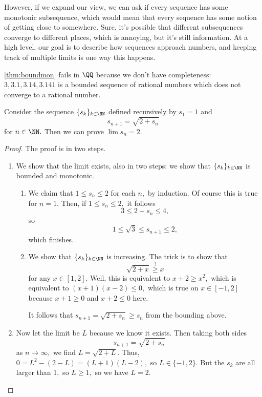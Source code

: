 However, if we expand our view, we can ask if every sequence has some monotonic subsequence, which would mean that every sequence has some notion of getting close to somewhere. Sure, it's possible that different subsequences converge to different places, which is annoying, but it's still information. At a high level, our goal is to describe how sequences approach numbers, and keeping track of multiple limits is one way this happens.
\begin{remark}
    \autoref{thm:boundmon} fails in $\QQ$ because we don't have completeness: $3,3.1,3.14,3.141$ is a bounded sequence of rational numbers which does not converge to a rational number.
\end{remark}
\begin{exercise}
    Consider the sequence $\{s_k\}_{k\in\NN}$ defined recursively by $s_1=1$ and
    \[s_{n+1}=\sqrt{2+s_n}\]
    for $n\in\NN.$ Then we can prove $\lim s_n=2.$
\end{exercise}
\begin{proof}
    The proof is in two steps.
    \begin{enumerate}
        \item We show that the limit exists, also in two steps: we show that $\{s_k\}_{k\in\NN}$ is bounded and monotonic.
        \begin{enumerate}
            \item We claim that $1\le s_n\le 2$ for each $n,$ by induction. Of course this is true for $n=1.$ Then, if $1\le s_n\le 2,$ it follows
            \[3\le2+s_n\le4,\]
            so
            \[1\le\sqrt3\le s_{n+1}\le2,\]
            which finishes.
            \item We show that $\{s_k\}_{k\in\NN}$ is increasing. The trick is to show that
            \[\sqrt{2+x}\stackrel?\ge x\]
            for any $x\in[1,2].$ Well, this is equivalent to $x+2\ge x^2,$ which is equivalent to $(x+1)(x-2)\le0,$ which is true on $x\in[-1,2]$ because $x+1\ge0$ and $x+2\le0$ here.

            It follows that $s_{n+1}=\sqrt{2+s_n}\ge s_n$ from the bounding above.
        \end{enumerate}
        \item Now let the limit be $L$ because we know it exists. Then taking both sides
        \[s_{n+1}=\sqrt{2+s_n}\]
        as $n\to\infty,$ we find $L=\sqrt{2+L}.$ Thus, $0=L^2-(2-L)=(L+1)(L-2),$ so $L\in\{-1,2\}.$ But the $s_k$ are all larger than $1,$ so $L\ge1,$ so we have $\boxed{L=2}.$
        \qedhere
    \end{enumerate}
\end{proof}
